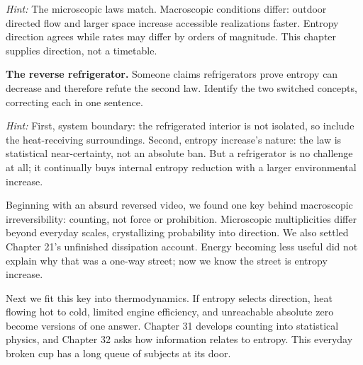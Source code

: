 \begin{puzzles}
  \textit{Hint:} The microscopic laws match. Macroscopic conditions differ: outdoor directed flow and larger space increase accessible realizations faster. Entropy direction agrees while rates may differ by orders of magnitude. This chapter supplies direction, not a timetable.

\item \textbf{The reverse refrigerator.} Someone claims refrigerators prove entropy can decrease and therefore refute the second law. Identify the two switched concepts, correcting each in one sentence.

  \textit{Hint:} First, system boundary: the refrigerated interior is not isolated, so include the heat-receiving surroundings. Second, entropy increase's nature: the law is statistical near-certainty, not an absolute ban. But a refrigerator is no challenge at all; it continually buys internal entropy reduction with a larger environmental increase.
\end{puzzles}

Beginning with an absurd reversed video, we found one key behind macroscopic irreversibility: counting, not force or prohibition. Microscopic multiplicities differ beyond everyday scales, crystallizing probability into direction. We also settled Chapter 21's unfinished dissipation account. Energy becoming less useful did not explain why that was a one-way street; now we know the street is entropy increase.

Next we fit this key into thermodynamics. If entropy selects direction, heat flowing hot to cold, limited engine efficiency, and unreachable absolute zero become versions of one answer. Chapter 31 develops counting into statistical physics, and Chapter 32 asks how information relates to entropy. This everyday broken cup has a long queue of subjects at its door.

